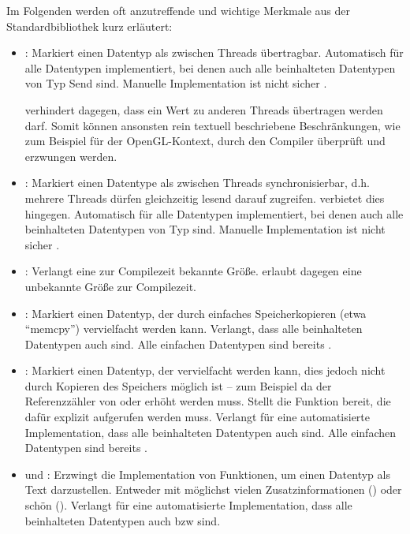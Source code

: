 Im Folgenden werden oft anzutreffende und wichtige Merkmale aus der Standardbibliothek kurz erläutert:
\begin{itemize}
	\item {}: Markiert einen Datentyp als zwischen Threads übertragbar. Automatisch für alle Datentypen implementiert, bei denen auch alle beinhalteten Datentypen von Typ Send sind. Manuelle Implementation ist nicht sicher \cite{rust:book:send_sync}.
	
	 verhindert dagegen, dass ein Wert zu anderen Threads übertragen werden darf.
	Somit können ansonsten rein textuell beschriebene Beschränkungen, wie zum Beispiel für der OpenGL-Kontext, durch den Compiler überprüft und erzwungen werden.
	
	\item {}: Markiert einen Datentype als zwischen Threads synchronisierbar, d.h. mehrere Threads dürfen gleichzeitig lesend darauf zugreifen.
	 verbietet dies hingegen.
	Automatisch für alle Datentypen implementiert, bei denen auch alle beinhalteten Datentypen von Typ  sind. Manuelle Implementation ist nicht sicher \cite{rust:book:send_sync}.
	
	\item {}: Verlangt eine zur Compilezeit bekannte Größe.  erlaubt dagegen eine unbekannte Größe zur Compilezeit.
	
	\item {}: Markiert einen Datentyp, der durch einfaches Speicherkopieren (etwa \enquote{memcpy}) vervielfacht werden kann. Verlangt, dass alle beinhalteten Datentypen auch  sind.
	Alle einfachen Datentypen sind bereits .
	
	\item {}: Markiert einen Datentyp, der vervielfacht werden kann, dies jedoch nicht durch Kopieren des Speichers möglich ist -- zum Beispiel da der Referenzzähler von  oder  erhöht werden muss.
	Stellt die Funktion  bereit, die dafür explizit aufgerufen werden muss.
	Verlangt für eine automatisierte Implementation, dass alle beinhalteten Datentypen auch  sind.
	Alle einfachen Datentypen sind bereits .
	
	\item {} und : Erzwingt die Implementation von Funktionen, um einen Datentyp als Text darzustellen. Entweder mit möglichst vielen Zusatzinformationen () oder schön ().
	Verlangt für eine automatisierte Implementation, dass alle beinhalteten Datentypen auch  bzw  sind.
	

\end{itemize}
